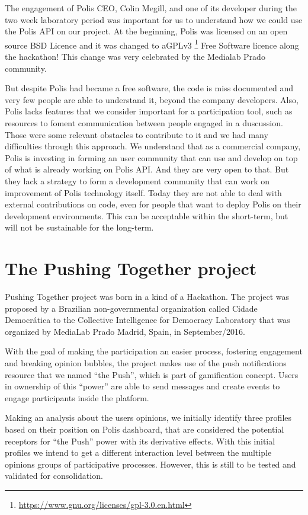 \documentclass{llncs}
\begin{document}
  The engagement of Polis CEO, Colin Megill, and one of its developer during the
two week laboratory period was important for us to understand how we could use
the Polis API on our project. At the beginning, Polis was licensed on an open
source BSD Licence and it was changed to
aGPLv3 \footnote{\url{https://www.gnu.org/licenses/gpl-3.0.en.html}}
Free Software licence along the hackathon! This change was very celebrated by
the Medialab Prado community.

  But despite Polis had became a free software, the code is miss documented and
very few people are able to understand it, beyond the company developers. Also,
Polis lacks features that we consider important for a participation tool, such
as resources to foment communication between people engaged in a duscussion. 
Those were some relevant obstacles to contribute to it and we had many 
difficulties through this approach. We understand that as a commercial company,
Polis is investing in forming an user community that can use and develop on top of what
is already working on Polis API. And they are very open to that. But they lack
a strategy to form a development community that can work on improvement of
Polis technology itself. Today they are not able to deal with external
contributions on code, even for people that want to deploy Polis on their
development environments. This can be acceptable within the short-term, but
will not be sustainable for the long-term.

\section{The Pushing Together project}
\label{sec:pushingtogether}

  Pushing Together project was born in a kind of a Hackathon. The project was
proposed by a Brazilian non-governmental organization called Cidade Democr\'atica
to the Collective Intelligence for Democracy Laboratory that was organized by
MediaLab Prado Madrid, Spain, in September/2016.

  With the goal of making the participation an easier process, fostering
engagement and breaking opinion bubbles, the project makes use of the
push notifications resource that we named ``the Push'', which is part of gamification
concept. Users in ownership of this ``power'' are able to send
messages and create events to engage participants inside the platform.

 Making an analysis about the users opinions, we initially identify three
 profiles based on their position on Polis dashboard, that are considered the potential
 receptors for ``the Push'' power with its derivative effects. With this
 initial profiles we intend to get a different interaction level between
 the multiple opinions groups of participative processes. However, this is still
 to be tested and validated for consolidation.
\end{document}
